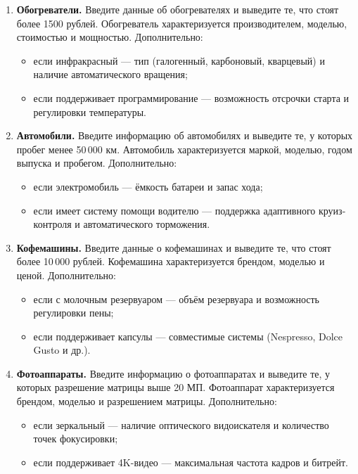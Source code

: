 \begin{enumerate}
    \item \textbf{Обогреватели.}  
    Введите данные об обогревателях и выведите те, что стоят более 1500 рублей.  
    Обогреватель характеризуется производителем, моделью, стоимостью и мощностью.  
    Дополнительно:
    \begin{itemize}
        \item если инфракрасный — тип (галогенный, карбоновый, кварцевый) и наличие автоматического вращения;
        \item если поддерживает программирование — возможность отсрочки старта и регулировки температуры.
    \end{itemize}

    \item \textbf{Автомобили.}  
    Введите информацию об автомобилях и выведите те, у которых пробег менее 50\,000 км.  
    Автомобиль характеризуется маркой, моделью, годом выпуска и пробегом.  
    Дополнительно:
    \begin{itemize}
        \item если электромобиль — ёмкость батареи и запас хода;
        \item если имеет систему помощи водителю — поддержка адаптивного круиз-контроля и автоматического торможения.
    \end{itemize}

    \item \textbf{Кофемашины.}  
    Введите данные о кофемашинах и выведите те, что стоят более 10\,000 рублей.  
    Кофемашина характеризуется брендом, моделью и ценой.  
    Дополнительно:
    \begin{itemize}
        \item если с молочным резервуаром — объём резервуара и возможность регулировки пены;
        \item если поддерживает капсулы — совместимые системы (Nespresso, Dolce Gusto и др.).
    \end{itemize}

    \item \textbf{Фотоаппараты.}  
    Введите информацию о фотоаппаратах и выведите те, у которых разрешение матрицы выше 20 МП.  
    Фотоаппарат характеризуется брендом, моделью и разрешением матрицы.  
    Дополнительно:
    \begin{itemize}
        \item если зеркальный — наличие оптического видоискателя и количество точек фокусировки;
        \item если поддерживает 4K-видео — максимальная частота кадров и битрейт.
    \end{itemize}


\end{enumerate}
